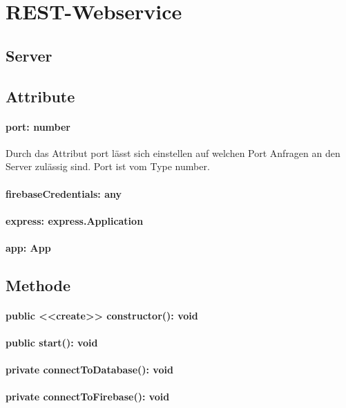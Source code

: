 \documentclass[parskip=full]{scrartcl}
\begin{document}
    \newpage
\newpage

\section{REST-Webservice}

\subsection{Server}
\subsection*{Attribute}
\paragraph{port: number} Durch das Attribut port lässt sich einstellen auf welchen Port Anfragen an den Server zulässig sind.
Port ist vom Type number.
\paragraph{firebaseCredentials: any}
\paragraph{express: express.Application}
\paragraph{app: App}
\paragraph{}

\subsection*{Methode}
\paragraph{public <<create>> constructor(): void}
\paragraph{public start(): void}
\paragraph{private connectToDatabase(): void}
\paragraph{private connectToFirebase(): void}
\end{document}
